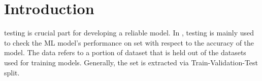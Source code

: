 \section{Introduction}
\label{sec:intro}

\Nlp testing is crucial part for developing a reliable \Nlp model. In
\Nlp, testing is mainly used to check the ML model's performance on
\ho set with respect to the accuracy of the model. The \ho data refers
to a portion of dataset that is held out of the datasets used for
training \ml models. Generally, the \ho set is extracted via
Train-Validation-Test split.


